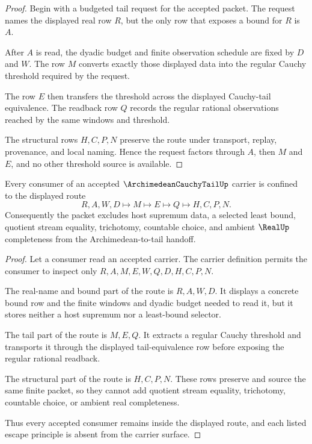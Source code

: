 \begin{proof}
Begin with a budgeted tail request for the accepted packet. The request names the displayed real row $R$, but the only row that exposes a bound for $R$ is $A$.

After $A$ is read, the dyadic budget and finite observation schedule are fixed by $D$ and $W$. The row $M$ converts exactly those displayed data into the regular Cauchy threshold required by the request.

The row $E$ then transfers the threshold across the displayed Cauchy-tail equivalence. The readback row $Q$ records the regular rational observations reached by the same windows and threshold.

The structural rows $H,C,P,N$ preserve the route under transport, replay, provenance, and local naming. Hence the request factors through $A$, then $M$ and $E$, and no other threshold source is available.
\end{proof}

\begin{theorem}
\label{thm:archimedean-cauchy-tail-nonescape-boundary}
Every consumer of an accepted $\ArchimedeanCauchyTailUp$ carrier is confined to the displayed route
$$
R,A,W,D \longmapsto M \longmapsto E \longmapsto Q \longmapsto H,C,P,N .
$$
Consequently the packet excludes host supremum data, a selected least bound, quotient stream equality, trichotomy, countable choice, and ambient $\RealUp$ completeness from the Archimedean-to-tail handoff.
\end{theorem}

\begin{proof}
Let a consumer read an accepted carrier. The carrier definition permits the consumer to inspect only $R,A,M,E,W,Q,D,H,C,P,N$.

The real-name and bound part of the route is $R,A,W,D$. It displays a concrete bound row and the finite windows and dyadic budget needed to read it, but it stores neither a host supremum nor a least-bound selector.

The tail part of the route is $M,E,Q$. It extracts a regular Cauchy threshold and transports it through the displayed tail-equivalence row before exposing the regular rational readback.

The structural part of the route is $H,C,P,N$. These rows preserve and source the same finite packet, so they cannot add quotient stream equality, trichotomy, countable choice, or ambient real completeness.

Thus every accepted consumer remains inside the displayed route, and each listed escape principle is absent from the carrier surface.
\end{proof}

